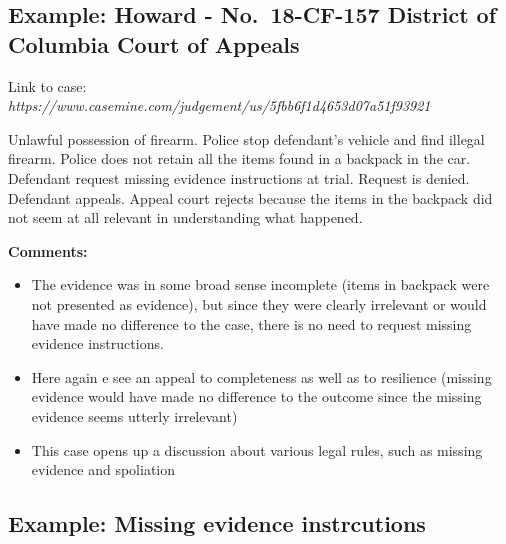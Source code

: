 \documentclass[
  10pt,
  dvipsnames,enabledeprecatedfontcommands]{scrartcl}
\begin{document}

\hypertarget{example-howard---no.-18-cf-157-district-of-columbia-court-of-appeals}{%
\subsection{Example: Howard - No.~18-CF-157 District of Columbia Court
of
Appeals}\label{example-howard---no.-18-cf-157-district-of-columbia-court-of-appeals}}

Link to case:
\textit{https://www.casemine.com/judgement/us/5fbb6f1d4653d07a51f93921}

Unlawful possession of firearm. Police stop defendant's vehicle and find
illegal firearm. Police does not retain all the items found in a
backpack in the car. Defendant request missing evidence instructions at
trial. Request is denied. Defendant appeals. Appeal court rejects
because the items in the backpack did not seem at all relevant in
understanding what happened.

\textbf{Comments:}

\begin{itemize}
\item
  The evidence was in some broad sense incomplete (items in backpack
  were not presented as evidence), but since they were clearly
  irrelevant or would have made no difference to the case, there is no
  need to request missing evidence instructions.
\item
  Here again e see an appeal to completeness as well as to resilience
  (missing evidence would have made no difference to the outcome since
  the missing evidence seems utterly irrelevant)
\item
  This case opens up a discussion about various legal rules, such as
  missing evidence and spoliation
\end{itemize}


\hypertarget{example-missing-evidence-instrcutions}{%
\subsection{Example: Missing evidence
instrcutions}\label{example-missing-evidence-instrcutions}}
\end{document}

